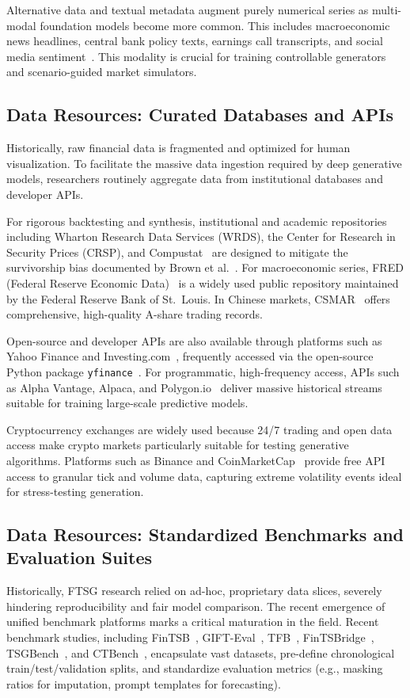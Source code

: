 Alternative data and textual metadata augment purely numerical series as multi-modal foundation models become more common. This includes macroeconomic news headlines, central bank policy texts, earnings call transcripts, and social media sentiment~\citep{tetlock2007giving,loughran2011liability}. This modality is crucial for training controllable generators and scenario-guided market simulators.

\subsection{Data Resources: Curated Databases and APIs}
Historically, raw financial data is fragmented and optimized for human visualization. To facilitate the massive data ingestion required by deep generative models, researchers routinely aggregate data from institutional databases and developer APIs.

For rigorous backtesting and synthesis, institutional and academic repositories including Wharton Research Data Services (WRDS), the Center for Research in Security Prices (CRSP), and Compustat~\citep{wrds,crsp,compustat} are designed to mitigate the survivorship bias documented by Brown et al.~\citep{brown1992survivorship}. For macroeconomic series, FRED (Federal Reserve Economic Data)~\citep{fred} is a widely used public repository maintained by the Federal Reserve Bank of St.~Louis. In Chinese markets, CSMAR~\citep{csmar} offers comprehensive, high-quality A-share trading records.

Open-source and developer APIs are also available through platforms such as Yahoo Finance and Investing.com~\citep{yahoofinance,investingcom}, frequently accessed via the open-source Python package \texttt{yfinance}~\citep{yfinance}. For programmatic, high-frequency access, APIs such as Alpha Vantage, Alpaca, and Polygon.io~\citep{alphavantage,alpaca,polygon} deliver massive historical streams suitable for training large-scale predictive models.

Cryptocurrency exchanges are widely used because 24/7 trading and open data access make crypto markets particularly suitable for testing generative algorithms. Platforms such as Binance and CoinMarketCap~\citep{binance,coinmarketcap} provide free API access to granular tick and volume data, capturing extreme volatility events ideal for stress-testing generation.

\subsection{Data Resources: Standardized Benchmarks and Evaluation Suites}
Historically, FTSG research relied on ad-hoc, proprietary data slices, severely hindering reproducibility and fair model comparison. The recent emergence of unified benchmark platforms marks a critical maturation in the field. Recent benchmark studies, including FinTSB~\citep{hu2025fintsb}, GIFT-Eval~\citep{GIFT-Eval}, TFB~\citep{TFB}, FinTSBridge~\citep{wang2025fintsbridge}, TSGBench~\citep{ang2023tsgbench}, and CTBench~\citep{ang2025ctbench}, encapsulate vast datasets, pre-define chronological train/test/validation splits, and standardize evaluation metrics (e.g., masking ratios for imputation, prompt templates for forecasting).


